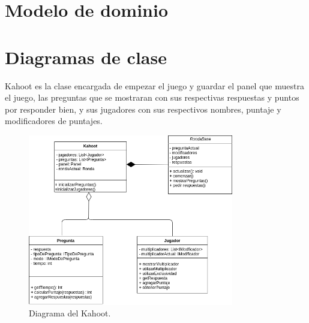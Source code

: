 \documentclass[titlepage,a4paper]{article}
\begin{document}
\section{Modelo de dominio}\label{sec:modelo}

\section{Diagramas de clase}\label{sec:diagramasdeclase}

Kahoot es la clase encargada de empezar el juego y guardar el panel que muestra el juego, las preguntas que se mostraran con sus respectivas respuestas y puntos por responder bien, y sus jugadores con sus respectivos nombres, puntaje y modificadores de puntajes.

\begin{figure}[H]
\centering
\includegraphics[width=0.8\textwidth]{diagramaGeneral.png}
\caption{\label{fig:class01}Diagrama del Kahoot.}
\end{figure}
\end{document}
